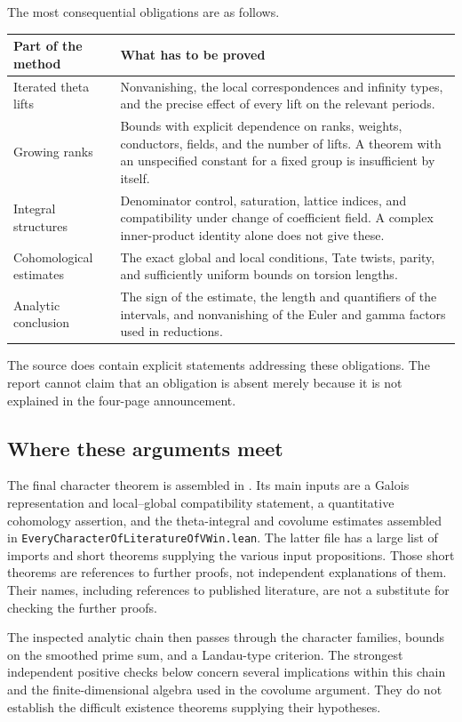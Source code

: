 \documentclass[11pt,a4paper]{article}
\theoremstyle{remark}
\newcommand{\src}[1]{\cite{#1}}
\newcommand{\code}[1]{\texttt{#1}}
\begin{document}
The most consequential obligations are as follows.
\begin{center}
\begin{tabular}{@{}p{3.1cm}p{10cm}@{}}
\toprule
Part of the method & What has to be proved \\
\midrule
Iterated theta lifts & Nonvanishing, the local correspondences and infinity types, and the precise effect of every lift on the relevant periods. \\
Growing ranks & Bounds with explicit dependence on ranks, weights, conductors, fields, and the number of lifts. A theorem with an unspecified constant for a fixed group is insufficient by itself. \\
Integral structures & Denominator control, saturation, lattice indices, and compatibility under change of coefficient field. A complex inner-product identity alone does not give these. \\
Cohomological estimates & The exact global and local conditions, Tate twists, parity, and sufficiently uniform bounds on torsion lengths. \\
Analytic conclusion & The sign of the estimate, the length and quantifiers of the intervals, and nonvanishing of the Euler and gamma factors used in reductions. \\
\bottomrule
\end{tabular}
\end{center}
The source does contain explicit statements addressing these obligations. The report cannot claim that an obligation is absent merely because it is not explained in the four-page announcement.

\subsection{Where these arguments meet}
The final character theorem is assembled in
. Its main inputs are a Galois representation and local--global compatibility statement, a quantitative cohomology assertion, and the theta-integral and covolume estimates assembled in
\code{EveryCharacterOfLiteratureOfVWin.lean}. The latter file has a large list of imports and short theorems supplying the various input propositions. Those short theorems are references to further proofs, not independent explanations of them. Their names, including references to published literature, are not a substitute for checking the further proofs. \src{S-assembly}

The inspected analytic chain then passes through the character families, bounds on the smoothed prime sum, and a Landau-type criterion. The strongest independent positive checks below concern several implications within this chain and the finite-dimensional algebra used in the covolume argument. They do not establish the difficult existence theorems supplying their hypotheses.
\end{document}
